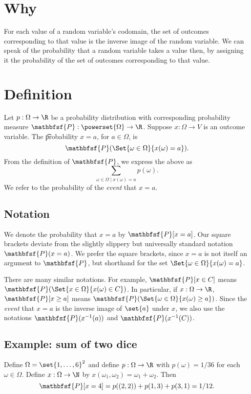 

\section*{Why}

For each value of a random variable's codomain, the set of outcomes corresponding to that value is the inverse image of the random variable.
We can speak of the probability that a random variable takes a value then, by assigning it the probability of the set of outcomes corresponding to that value.

\section*{Definition}

Let $p: \Omega  \to \R $ be a probability distribution with corresponding probability measure $\mathbfsf{P} : \powerset{\Omega } \to \R $.
Suppose $x: \Omega  \to V$ is an outcome variable.
The \t{probability $x = a$}, for $a \in \Omega $, is
    \[
\textstyle
\mathbfsf{P} (\Set{\omega  \in \Omega }{x(\omega ) = a}).
    \]
From the definition of $\mathbfsf{P} $, we express the above as
    \[
\textstyle
\sum_{\omega  \in \Omega  \mid  x(\omega ) = a} p(\omega ).
    \]
We refer to the probability of the \textit{event} that $x = a$.

\subsection*{Notation}

We denote the probability that $x = a$ by $\mathbfsf{P} [x =a]$.
Our square brackets deviate from the slightly slippery but universally standard notation $\mathbfsf{P} (x = a)$.
We prefer the square brackets, since $x=a$ is not itself an argument to $\mathbfsf{P} $, but shorthand for the set $\Set{\omega  \in \Omega }{x(\omega ) = a}$.

There are many similar notations.
For example, $\mathbfsf{P} [x \in C]$ means $\mathbfsf{P} (\Set{x \in \Omega }{x(\omega ) \in C})$.
In particular, if $x: \Omega  \to \R $, $\mathbfsf{P} [x \geq a]$ means $\mathbfsf{P} (\Set{\omega  \in \Omega }{x(\omega ) \geq a})$.
Since the \textit{event} that $x = a$ is the inverse image of $\set{a}$ under $x$, we also use the notations $\mathbfsf{P} (x^{-1}(a))$ and $\mathbfsf{P} (x^{-1}(C))$.

\subsection*{Example: sum of two dice}

Define $\Omega  = \set{1, \dots , 6}^2$ and define $p: \Omega \to \R $ with $p(\omega ) = 1/36$ for each $\omega  \in \Omega $.
Define $x: \Omega  \to \N  $ by $x(\omega _1, \omega _2) = \omega _1 + \omega _2$.
Then
    \[
\mathbfsf{P} [x = 4] = p((2, 2)) + p(1, 3) + p(3, 1) = 1/12.
    \]
